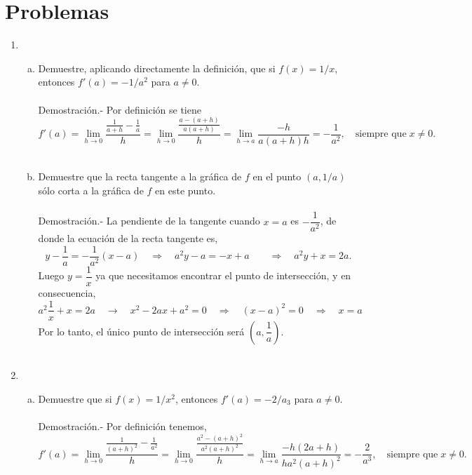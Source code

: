 \section{Problemas}

\begin{enumerate}[\bfseries 1]

    \item 
	\begin{enumerate}[(a)]

	    \item Demuestre, aplicando directamente la definición, que si $f(x)=1/x$, entonces $f'(a)=-1/a^2$ para $a\neq 0$.\\\\
		Demostración.-\; Por definición se tiene $$f'(a)=\lim_{h\to 0}\dfrac{\frac{1}{a+h}-\frac{1}{a}}{h} = \lim_{h\to 0} \dfrac{\frac{a-(a+h)}{a(a+h)}}{h} = \lim_{h\to a}\dfrac{-h}{a(a+h)h} = -\dfrac{1}{a^2}, \quad \mbox{siempre que}\; x\neq 0.$$\\

	    \item Demuestre que la recta tangente a la gráfica de $f$ en el punto $(a,1/a)$ sólo corta a la gráfica de $f$ en este punto.\\\\
		Demostración.-\; La pendiente de la tangente cuando $x=a$ es $-\dfrac{1}{a^2}$, de donde la ecuación de la recta tangente es,
		$$y-\dfrac{1}{a} = -\dfrac{1}{a^2}(x-a)\quad \Rightarrow \quad a^2y-a=-x+a \qquad \Rightarrow \quad a^2y+x=2a.$$
		Luego $y=\dfrac{1}{x}$ ya que necesitamos encontrar el punto de intersección, y en consecuencia,
		$$a^2\dfrac{1}{x}+x=2a\quad \rightarrow \quad x^2-2ax+a^2=0 \quad \Rightarrow \quad (x-a)^2=0 \quad \Rightarrow \quad x=a$$
		Por lo tanto, el único punto de intersección será $\left(a,\dfrac{1}{a}\right)$.\\\\

	\end{enumerate}

    \item
	\begin{enumerate}[(a)]

	    \item Demuestre que si $f(x)=1/x^2$, entonces $f'(a)=-2/a_3$ para $a\neq 0$.\\\\
		Demostración.-\; Por definición tenemos,
		$$f'(a)=\lim_{h\to 0}\dfrac{\frac{1}{(a+h)^2}-\frac{1}{a^2}}{h} = \lim_{h\to 0} \dfrac{\frac{a^2-(a+h)^2}{a^2(a+h)^2}}{h} = \lim_{h\to a}\dfrac{-h(2a+h)}{ha^2(a+h)^2} = -\dfrac{2}{a^3}, \quad \mbox{siempre que}\; x\neq 0.$$\\


\end{enumerate}
\end{enumerate}
